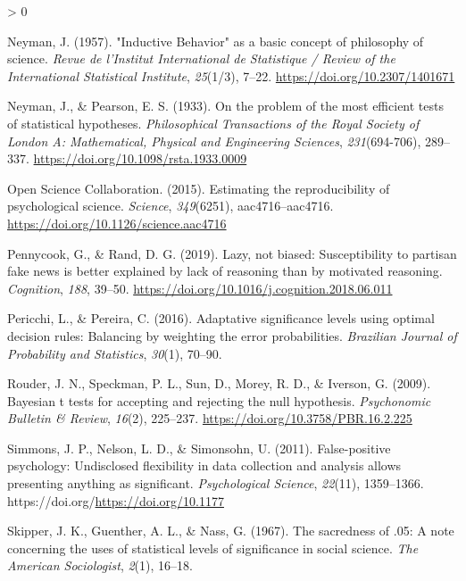 \documentclass[
  english,
  ,man, a4paper,floatsintext]{apa6}
\newlength{\cslhangindent}
\newenvironment{CSLReferences}[2] %
 {%
  \setlength{\parindent}{0pt}
  \ifodd #1 \everypar{\setlength{\hangindent}{\cslhangindent}}\ignorespaces\fi
  \ifnum #2 > 0
  \setlength{\parskip}{#2\baselineskip}
  \fi
 }%
 {}
\begin{document}
\begin{CSLReferences}{1}{0}
\leavevmode\hypertarget{ref-neyman_1957}{}%
Neyman, J. (1957). "{Inductive Behavior}" as a basic concept of philosophy of science. \emph{Revue de l'Institut International de Statistique / Review of the International Statistical Institute}, \emph{25}(1/3), 7--22. \url{https://doi.org/10.2307/1401671}

\leavevmode\hypertarget{ref-neyman_problem_1933}{}%
Neyman, J., \& Pearson, E. S. (1933). On the problem of the most efficient tests of statistical hypotheses. \emph{Philosophical Transactions of the Royal Society of London A: Mathematical, Physical and Engineering Sciences}, \emph{231}(694-706), 289--337. \url{https://doi.org/10.1098/rsta.1933.0009}

\leavevmode\hypertarget{ref-open2015estimating}{}%
Open Science Collaboration. (2015). Estimating the reproducibility of psychological science. \emph{Science}, \emph{349}(6251), aac4716--aac4716. \url{https://doi.org/10.1126/science.aac4716}

\leavevmode\hypertarget{ref-pennycook2019lazy}{}%
Pennycook, G., \& Rand, D. G. (2019). Lazy, not biased: Susceptibility to partisan fake news is better explained by lack of reasoning than by motivated reasoning. \emph{Cognition}, \emph{188}, 39--50. \url{https://doi.org/10.1016/j.cognition.2018.06.011}

\leavevmode\hypertarget{ref-pericchi2016adaptative}{}%
Pericchi, L., \& Pereira, C. (2016). Adaptative significance levels using optimal decision rules: Balancing by weighting the error probabilities. \emph{Brazilian Journal of Probability and Statistics}, \emph{30}(1), 70--90.

\leavevmode\hypertarget{ref-rouder_bayesian_2009}{}%
Rouder, J. N., Speckman, P. L., Sun, D., Morey, R. D., \& Iverson, G. (2009). Bayesian t tests for accepting and rejecting the null hypothesis. \emph{Psychonomic Bulletin \& Review}, \emph{16}(2), 225--237. \url{https://doi.org/10.3758/PBR.16.2.225}

\leavevmode\hypertarget{ref-simmons2011false}{}%
Simmons, J. P., Nelson, L. D., \& Simonsohn, U. (2011). False-positive psychology: Undisclosed flexibility in data collection and analysis allows presenting anything as significant. \emph{Psychological Science}, \emph{22}(11), 1359--1366. https://doi.org/\url{https://doi.org/10.1177}

\leavevmode\hypertarget{ref-skipper_sacredness_1967}{}%
Skipper, J. K., Guenther, A. L., \& Nass, G. (1967). The sacredness of .05: A note concerning the uses of statistical levels of significance in social science. \emph{The American Sociologist}, \emph{2}(1), 16--18.


\end{CSLReferences}
\end{document}
